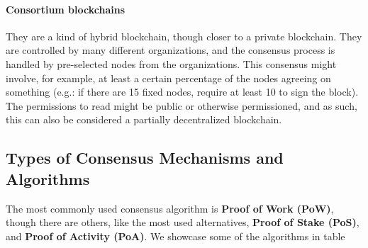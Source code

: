     \paragraph{Consortium blockchains} They are a kind of hybrid blockchain, though closer to a private blockchain. They are controlled by many different organizations, and the consensus process is handled by pre-selected nodes from the organizations. This consensus might involve, for example, at least a certain percentage of the nodes agreeing on something (e.g.: if there are 15 fixed nodes, require at least 10 to sign the block). The permissions to read might be public or otherwise permissioned, and as such, this can also be considered a partially decentralized blockchain.

    \subsection{Types of Consensus Mechanisms and Algorithms}
    
     The most commonly used consensus algorithm is \textbf{Proof of Work (PoW)}, though there are others, like the most used alternatives, \textbf{Proof of Stake (PoS)}, and \textbf{Proof of Activity (PoA)}. We showcase some of the algorithms in table %
    


